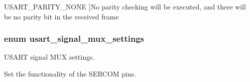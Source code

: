 \begin{Desc}
\begin{description}
{\hypertarget{group__asfdoc__sam0__sercom__usart__group_gga867cc5f0ea7d3bf651d68f0046cf6f41aecf52ec650226bdc63e12a21d3b5585d}{}U\+S\+A\+R\+T\+\_\+\+P\+A\+R\+I\+T\+Y\+\_\+\+N\+O\+N\+E\label{group__asfdoc__sam0__sercom__usart__group_gga867cc5f0ea7d3bf651d68f0046cf6f41aecf52ec650226bdc63e12a21d3b5585d}
}]No parity checking will be executed, and there will be no parity bit in the received frame \end{description}
\end{Desc}
\hypertarget{group__asfdoc__sam0__sercom__usart__group_ga87bbdb9f7edb3f1866aeb498bf7c9077}{}
\subsubsection[{usart\+\_\+signal\+\_\+mux\+\_\+settings}]{\setlength{\rightskip}{0pt plus 5cm}enum {\bf usart\+\_\+signal\+\_\+mux\+\_\+settings}}\label{group__asfdoc__sam0__sercom__usart__group_ga87bbdb9f7edb3f1866aeb498bf7c9077}


U\+S\+A\+R\+T signal M\+U\+X settings. 

Set the functionality of the S\+E\+R\+C\+O\+M pins.

